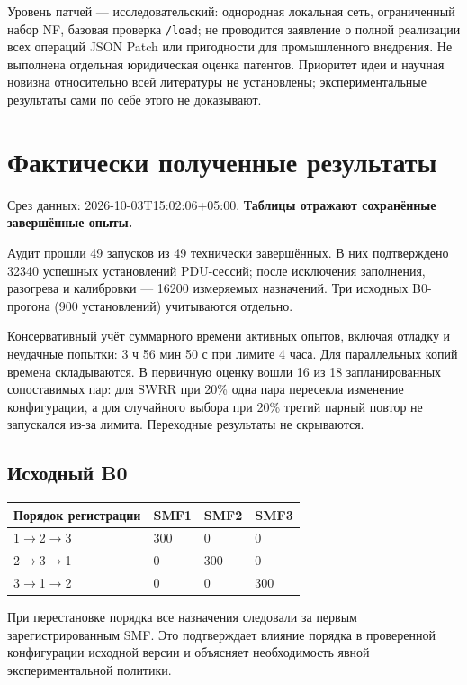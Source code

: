 \documentclass[11pt,a4paper]{article}
\begin{document}
Уровень патчей — исследовательский: однородная локальная сеть, ограниченный набор NF, базовая проверка \texttt{/load}; не проводится заявление о полной реализации всех операций JSON Patch или пригодности для промышленного внедрения. Не выполнена отдельная юридическая оценка патентов. Приоритет идеи и научная новизна относительно всей литературы не установлены; экспериментальные результаты сами по себе этого не доказывают.



\section*{Фактически полученные результаты}


Срез данных: 2026-10-03T15:02:06+05:00. \textbf{Таблицы отражают сохранённые завершённые опыты.}

Аудит прошли 49 запусков из 49 технически завершённых. В них подтверждено 32340 успешных установлений PDU-сессий; после исключения заполнения, разогрева и калибровки — 16200 измеряемых назначений. Три исходных B0-прогона (900 установлений) учитываются отдельно.

Консервативный учёт суммарного времени активных опытов, включая отладку и неудачные попытки: 3 ч 56 мин 50 с при лимите 4 часа. Для параллельных копий времена складываются. В первичную оценку вошли 16 из 18 запланированных сопоставимых пар: для SWRR при 20\% одна пара пересекла изменение конфигурации, а для случайного выбора при 20\% третий парный повтор не запускался из-за лимита. Переходные результаты не скрываются.

\subsection*{Исходный B0}

{\footnotesize\setlength{\tabcolsep}{3pt}\renewcommand{\arraystretch}{1.25}
\begin{longtable}{p{3.94cm}p{3.94cm}p{3.94cm}p{3.94cm}}
\toprule
Порядок регистрации & SMF1 & SMF2 & SMF3 \\
\midrule\endhead
1\ensuremath{\to}2\ensuremath{\to}3 & 300 & 0 & 0 \\
2\ensuremath{\to}3\ensuremath{\to}1 & 0 & 300 & 0 \\
3\ensuremath{\to}1\ensuremath{\to}2 & 0 & 0 & 300 \\
\bottomrule\end{longtable}}

При перестановке порядка все назначения следовали за первым зарегистрированным SMF. Это подтверждает влияние порядка в проверенной конфигурации исходной версии и объясняет необходимость явной экспериментальной политики.
\end{document}
